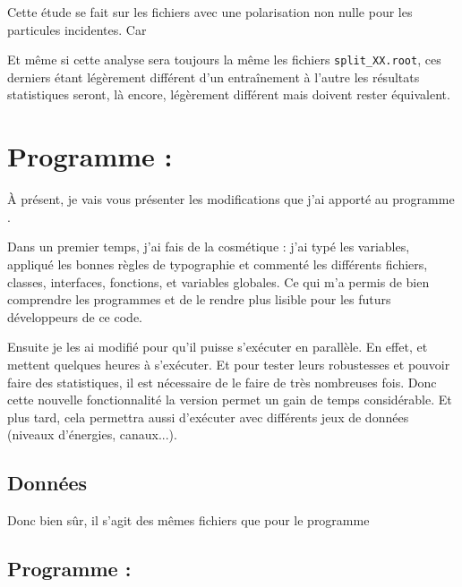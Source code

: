Cette étude se fait sur les fichiers avec une polarisation non nulle pour les particules incidentes. Car 



	






Et même si cette analyse sera toujours la même \qqs les fichiers \texttt{split\_XX.root}, ces derniers étant légèrement différent d'un entraînement à l'autre les résultats statistiques \Figure{\ref{files:stats}} seront, là encore, légèrement différent mais doivent rester équivalent.

\section{Programme : \ilcsoft}

À présent, je vais vous présenter les modifications que j'ai apporté au programme \original.

Dans un premier temps, j'ai fais de la cosmétique : j'ai typé les variables, appliqué les bonnes règles de typographie et commenté les différents fichiers, classes, interfaces, fonctions, et variables globales. Ce qui m'a permis de bien comprendre les programmes et de le rendre plus lisible pour les futurs développeurs de ce code.

Ensuite je les ai modifié pour qu'il puisse s'exécuter en parallèle. En effet, \processor et \analysis mettent quelques heures à s'exécuter. Et pour tester leurs robustesses et pouvoir faire des statistiques, il est nécessaire de le faire de très nombreuses fois. Donc cette nouvelle fonctionnalité la version \ilcsoft permet un gain de temps considérable. Et plus tard, cela permettra aussi d'exécuter avec différents jeux de données (niveaux d'énergies, canaux...).

\subsection{Données}

Donc bien sûr, il s'agit des mêmes fichiers \SLCIO que pour le programme \original \Figure{\ref{data:list}}

\subsection{Programme : \processor}

